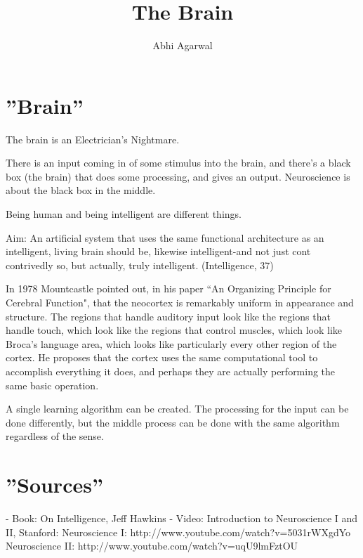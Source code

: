 \documentclass[11pt, oneside]{article}   	%
\title{The Brain}
\author{Abhi Agarwal}
\begin{document}
\maketitle

\section{''Brain''}

\par The brain is an Electrician's Nightmare.

\par There is an input coming in of some stimulus into the brain, and there's a black box (the brain) that does some processing, and gives an output. Neuroscience is about the black box in the middle.

\par Being human and being intelligent are different things.

\par Aim: An artificial system that uses the same functional architecture as an intelligent, living brain should be, likewise intelligent-and not just cont contrivedly so, but actually, truly intelligent. (Intelligence, 37)

\par In 1978 Mountcastle pointed out, in his paper ``An Organizing Principle for Cerebral Function", that the neocortex is remarkably uniform in appearance and structure. The regions that handle auditory input look like the regions that handle touch, which look like the regions that control muscles, which look like Broca's language area, which looks like particularly every other region of the cortex. He proposes that the cortex uses the same computational tool to accomplish everything it does, and perhaps they are actually performing the same basic operation.

\par A single learning algorithm can be created. The processing for the input can be done differently, but the middle process can be done with the same algorithm regardless of the sense.

\section{''Sources''}

- Book: On Intelligence, Jeff Hawkins
\newline - Video: Introduction to Neuroscience I and II, Stanford: 
\newline \indent Neuroscience I: http://www.youtube.com/watch?v=5031rWXgdYo
\newline \indent Neuroscience II: http://www.youtube.com/watch?v=uqU9lmFztOU
\end{document}
